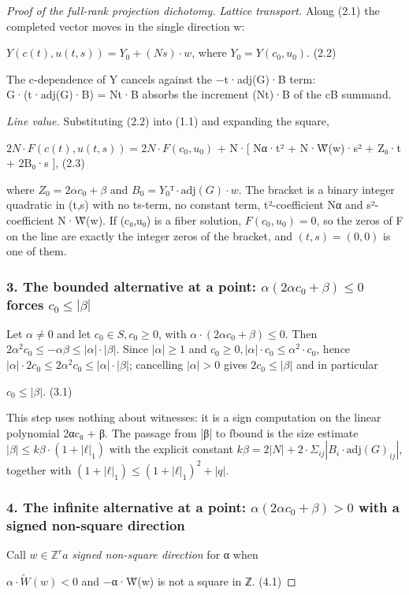 \documentclass[11pt]{article}
\theoremstyle{plain}
\theoremstyle{definition}
\theoremstyle{remark}
\theoremstyle{plain}
\theoremstyle{definition}
\theoremstyle{remark}
\theoremstyle{plain}
\theoremstyle{definition}
\theoremstyle{remark}
\begin{document}
\begin{proof}[Proof of the full-rank projection dichotomy]
\emph{Lattice transport.} Along (2.1) the completed vector moves in the single direction w:

$Y(c(t), u(t,s)) = Y_{0} + (N s)·w$,   where $Y_{0} = Y(c_{0},u_{0})$.           (2.2)

The c-dependence of Y cancels against the −t·adj(G)·B term: G·(t·adj(G)·B) = Nt·B absorbs the increment (Nt)·B of the cB summand.

\emph{Line value.} Substituting (2.2) into (1.1) and expanding the square,

$2N·F(c(t), u(t,s)) = 2N·F(c_{0},u_{0})$       + N·[ Nα·t² + N·W̃(w)·s² + Z₀·t + 2B₀·s ],                    (2.3)

where $Z_{0} = 2α c_{0} + β$ and $B_{0} = Y_{0}ᵀ·\mathrm{adj}(G)·w$. The bracket is a binary integer quadratic in (t,s) with no ts-term, no constant term, t²-coefficient Nα and s²-coefficient N·W̃(w). If (c₀,u₀) is a fiber solution, $F(c_{0},u_{0}) = 0$, so the zeros of F on the line are exactly the integer zeros of the bracket, and $(t,s) = (0,0)$ is one of them.

\subsubsection*{3. The bounded alternative at a point: $α(2αc_{0}+β) ≤ 0$ forces $c_{0} ≤ |β|$}
Let $α ≠ 0$ and let $c_{0} ∈ S, c_{0} ≥ 0$, with $α·(2α c_{0} + β) ≤ 0$. Then $2α^{2}c_{0} ≤ −αβ ≤ |α|·|β|$. Since $|α| ≥ 1$ and $c_{0} ≥ 0, |α|·c_{0} ≤ α^{2}·c_{0}$, hence $|α|·2c_{0} ≤ 2α^{2}c_{0} ≤ |α|·|β|$; cancelling $|α| > 0$ gives $2c_{0} ≤ |β|$ and in particular

$c_{0} ≤ |β|$.                                                        (3.1)

This step uses nothing about witnesses: it is a sign computation on the linear polynomial 2αc₀ + β. The passage from |β| to fbound is the size estimate $|β| ≤ kβ·(1+|ℓ|_{1})$ with the explicit constant $kβ = 2|N| + 2·Σ_{ij}|B_{i}·\mathrm{adj}(G)_{ij}|$, together with $(1+|ℓ|_{1}) ≤ (1+|ℓ|_{1})^{2} + |q|$.

\subsubsection*{4. The infinite alternative at a point: $α(2αc_{0}+β) > 0$ with a signed non-square direction}
Call $w ∈ ℤ^{r} a$ \emph{signed non-square direction} for α when

$α·\tilde{W}(w) < 0$  and  −α·W̃(w) is not a square in ℤ.                  (4.1)


\end{proof}
\end{document}
